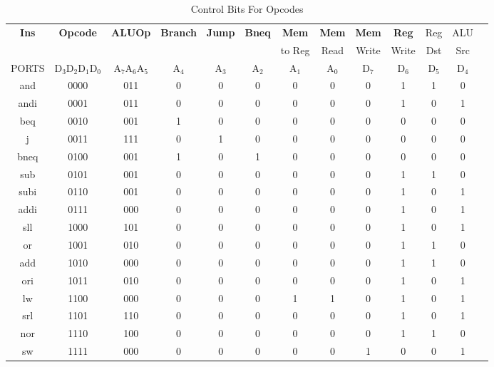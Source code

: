 \documentclass{article}
\begin{document}
\begin{table}[!h]
    \centering
    \small
    \begin{tabular}{|c|c|c|c|c|c|c|c|c|c|c|c|c|}
        \hline
        \multirow{2}{*}{\textbf{Ins}} & \multirow{2}{*}{\textbf{Opcode}} & \multirow{2}{*}{\textbf{ALUOp}} & \multirow{2}{*}{\textbf{Branch}} & \multirow{2}{*}{\textbf{Jump}} & \multirow{2}{*}{\textbf{Bneq}} & \textbf{Mem} & \textbf{Mem} & \textbf{Mem} & \textbf{Reg} & Reg & ALU \\
        & & & & & & to Reg & Read & Write & Write & Dst & Src \\ \hline \hline
        PORTS & D$_3$D$_2$D$_1$D$_0$ & A$_7$A$_6$A$_5$ & A$_4$ & A$_3$ & A$_2$ & A$_1$ & A$_0$ & D$_7$ & D$_6$ & D$_5$ & D$_4$ \\ \hline
        and & 0000 & 011 & 0 & 0 & 0 & 0 & 0 & 0 & 1 & 1 & 0  \\ \hline
        andi & 0001 & 011 & 0 & 0 & 0 & 0 & 0 & 0 & 1 & 0 & 1 \\ \hline
        beq & 0010 & 001 & 1 & 0 & 0 & 0 & 0 & 0 & 0 & 0 & 0 \\ \hline
        j & 0011 & 111 & 0 & 1 & 0 & 0 & 0 & 0 & 0 & 0 & 0 \\ \hline
        bneq & 0100 & 001 & 1 & 0 & 1 & 0 & 0 & 0 & 0 & 0 & 0 \\ \hline
        sub & 0101 & 001 & 0 & 0 & 0 & 0 & 0 & 0 & 1 & 1 & 0 \\ \hline
        subi & 0110 & 001 & 0 & 0 & 0 & 0 & 0 & 0 & 1 & 0 & 1 \\ \hline
        addi & 0111 & 000 & 0 & 0 & 0 & 0 & 0 & 0 & 1 & 0 & 1 \\ \hline
        sll & 1000 & 101 & 0 & 0 & 0 & 0 & 0 & 0 & 1 & 0 & 1 \\ \hline
        or & 1001 & 010 & 0 & 0 & 0 & 0 & 0 & 0 & 1 & 1 & 0  \\ \hline
        add & 1010 & 000 & 0 & 0 & 0 & 0 & 0 & 0 & 1 & 1  & 0 \\ \hline
        ori & 1011 & 010 & 0 & 0 & 0 & 0 & 0 & 0 & 1 & 0 & 1 \\ \hline
        lw & 1100 & 000 & 0 & 0 & 0 & 1 & 1 & 0 & 1 & 0 & 1 \\ \hline
        srl & 1101 & 110 & 0 & 0 & 0 & 0 & 0 & 0 & 1 & 0 & 1 \\ \hline
        nor & 1110 & 100  & 0 & 0 & 0 & 0 & 0 & 0 & 1 & 1 & 0 \\ \hline
        sw & 1111 & 000 & 0 & 0 & 0 & 0 & 0 & 1 & 0 & 0 & 1 \\ \hline
        \hline
    \end{tabular}
    \label{tab:1}
    \caption{Control Bits For Opcodes}
\end{table}
\end{document}

